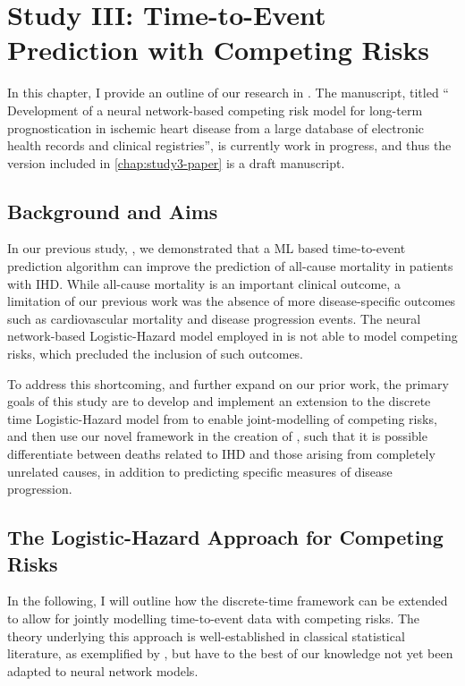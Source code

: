 \chapter{Study III: Time-to-Event Prediction with Competing Risks}
\label{chap:study3-outline}

In this chapter, I provide an outline of our research in \studyiii{}.
The manuscript, titled \enquote{%
    Development of a neural network-based competing risk model for long-term
    prognostication in ischemic heart disease from a large database of
    electronic health records and clinical registries},
is currently work in progress, 
and thus the version included in \cref{chap:study3-paper} is 
a draft manuscript.

\section{Background and Aims}

In our previous study, \studyii{}, we demonstrated that a \ac{ML} based 
time-to-event prediction algorithm can improve the prediction of all-cause
mortality in patients with \ac{IHD}. 
While all-cause mortality is an important clinical outcome, 
a limitation of our previous work was the absence of more
disease-specific outcomes such as cardiovascular mortality
and disease progression events.
The neural network-based Logistic-Hazard model employed in 
is not able to model competing risks, which precluded the inclusion
of such outcomes.

To address this shortcoming, and further expand on our prior work,
the primary goals of this study are to develop and implement an extension 
to the discrete time Logistic-Hazard model from \textcite{gensheimerScalable2019} 
to enable joint-modelling of competing risks,
and then use our novel framework in the creation of , 
such that it is possible differentiate between deaths related to 
\ac{IHD} and those arising from completely unrelated causes,
in addition to predicting specific measures of disease progression.

\section{The Logistic-Hazard Approach for Competing Risks}

In the following, I will outline how the discrete-time framework can 
be extended to allow for jointly modelling time-to-event data with competing
risks. The theory underlying this approach is well-established in
classical statistical literature, as exemplified by \textcite{tutzModeling2016}, 
but have to the best of our knowledge not yet been adapted to 
neural network models. 

